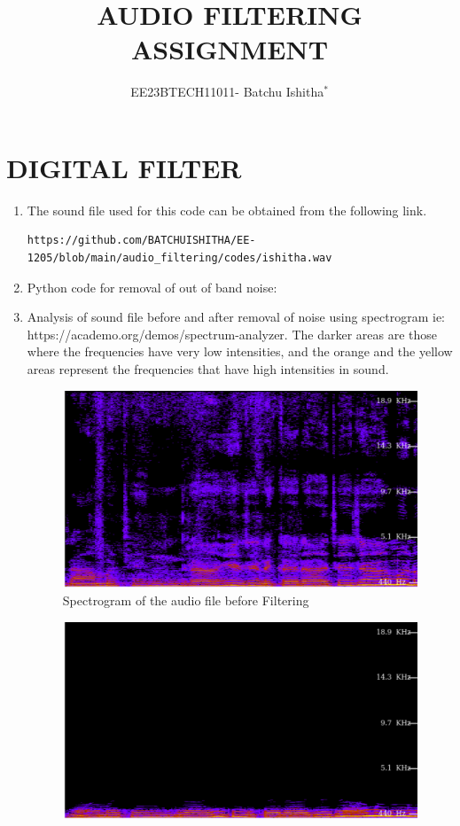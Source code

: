 \documentclass[journal,12pt,twocolumn]{IEEEtran}
\theoremstyle{remark}
\begin{document}

\title{ AUDIO FILTERING ASSIGNMENT}
\author{EE23BTECH11011- Batchu Ishitha$^{*}$%
}
\maketitle

\bigskip

\renewcommand{\thefigure}{\theenumi}
\renewcommand{\thetable}{\theenumi}

\section{DIGITAL FILTER}
\begin{enumerate}[label=\thesection\arabic*.,ref=\thesection.\theenumi]
\item The sound file used for this code can be obtained from the following link.
\begin{lstlisting}
https://github.com/BATCHUISHITHA/EE-1205/blob/main/audio_filtering/codes/ishitha.wav
\end{lstlisting}
\item Python code for removal of out of band noise:
  \label{1.2}
\item Analysis of sound file before and after removal of noise using spectrogram ie: https://academo.org/demos/spectrum-analyzer.
\solution
The darker areas are those where the frequencies have very low intensities, and the orange and the yellow areas represent the frequencies that have high intensities in sound.
\begin{figure}[ht]
    \includegraphics[width=0.8\columnwidth]{figs/beforefiltering.png }
    \caption{Spectrogram of the audio file before Filtering}
    \label{fig:beforefiltering}
\end{figure}
\begin{figure}[ht]
    \includegraphics[width=0.8\columnwidth]{figs/afterfiltering.png}

\end{figure}
\end{enumerate}
\end{document}
